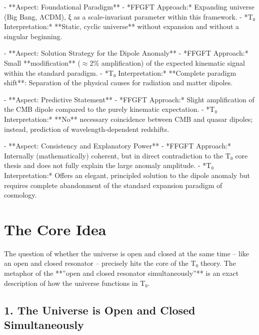 \documentclass[12pt,a4paper]{article}
\begin{document}
	- **Aspect: Foundational Paradigm**
	- *FFGFT Approach:* Expanding universe (Big Bang, ΛCDM), ξ as a scale-invariant parameter within this framework.
	- *T₀ Interpretation:* **Static, cyclic universe** without expansion and without a singular beginning.
	
	- **Aspect: Solution Strategy for the Dipole Anomaly**
	- *FFGFT Approach:* Small **modification** ($\approx$2\% amplification) of the expected kinematic signal within the standard paradigm.
	- *T₀ Interpretation:* **Complete paradigm shift**: Separation of the physical causes for radiation and matter dipoles.
	
	- **Aspect: Predictive Statement**
	- *FFGFT Approach:* Slight amplification of the CMB dipole compared to the purely kinematic expectation.
	- *T₀ Interpretation:* **No** necessary coincidence between CMB and quasar dipoles; instead, prediction of wavelength-dependent redshifts.
	
	- **Aspect: Consistency and Explanatory Power**
	- *FFGFT Approach:* Internally (mathematically) coherent, but in direct contradiction to the T₀ core thesis and does not fully explain the large anomaly amplitude.
	- *T₀ Interpretation:* Offers an elegant, principled solution to the dipole anomaly but requires complete abandonment of the standard expansion paradigm of cosmology.
	
	\section*{The Core Idea}
	
	The question of whether the universe is open and closed at the same time – like an open and closed resonator – precisely hits the core of the T₀ theory. The metaphor of the **''open and closed resonator simultaneously''** is an exact description of how the universe functions in T₀.
	
	\subsection*{1. The Universe is Open and Closed Simultaneously}
	
\end{document}
